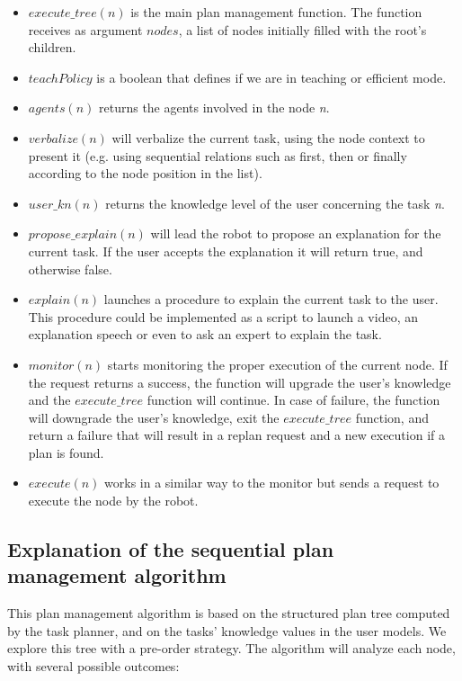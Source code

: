 \begin{itemize}
\item \textit{$execute\_tree(n)$} is the main plan management function. The function receives as argument \textit{$nodes$}, a list of nodes initially filled with the root's children.
\item \textit{$teachPolicy$} is a boolean that defines if we are in teaching or efficient mode.
\item \textit{$agents(n)$} returns the agents involved in the node \textit{n}.
\item \textit{$verbalize(n)$} will verbalize the current task, using the node context to present it (e.g. using sequential relations such as first, then or finally according to the node position in the list).
\item \textit{$user\_kn(n)$} returns the knowledge level of the user concerning the task \textit{n}.
\item \textit{$propose\_explain(n)$} will lead the robot to propose an explanation for the current task. If the user accepts the explanation it will return true, and otherwise false.
\item \textit{$explain(n)$} launches a procedure to explain the current task to the user. This procedure could be implemented as a script to launch a video, an explanation speech or even to ask an expert to explain the task.
\item \textit{$monitor(n)$} starts monitoring the proper execution of the current node. If the request returns a success, the function will upgrade the user's knowledge and the \textit{$execute\_tree$} function will continue. In case of failure, the function will downgrade the user's knowledge, exit the \textit{$execute\_tree$} function, and return a failure that will result in a replan request and a new execution if a plan is found.
\item \textit{$execute(n)$} works in a similar way to the monitor but sends a request to execute the node by the robot.
\end{itemize}
 
\subsection{Explanation of the sequential plan management algorithm}
This plan management algorithm is based on the structured plan tree computed by the task planner, and on the tasks' knowledge values in the user models. We explore this tree with a pre-order strategy. The algorithm will analyze each node, with several possible outcomes:

